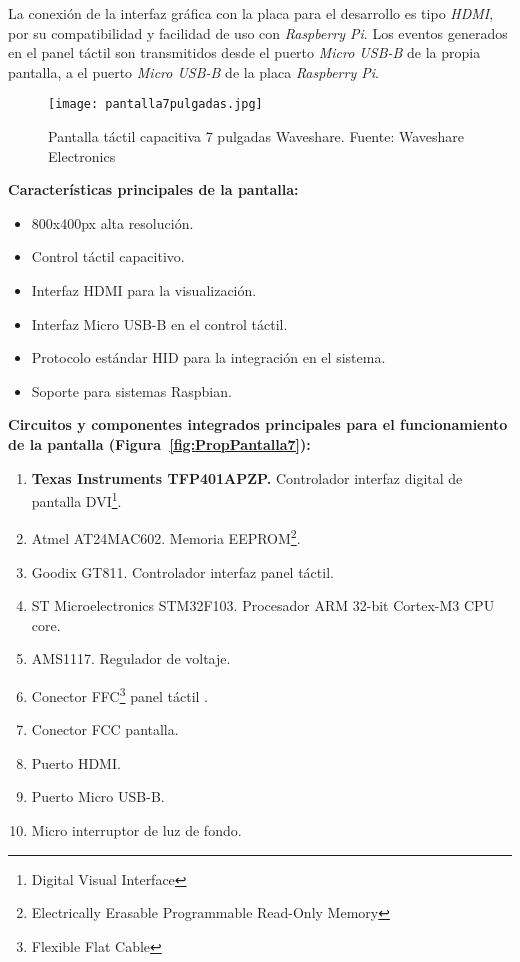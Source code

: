 La conexión de la interfaz gráfica con la placa para el desarrollo es tipo \emph{HDMI}, por su compatibilidad y facilidad de uso con \emph{Raspberry Pi}. Los eventos generados en el panel táctil son transmitidos desde el puerto \emph{Micro USB-B} de la propia pantalla, a el puerto \emph{ Micro USB-B} de la placa \emph{Raspberry Pi}.

\begin{figure}[!h]
\begin{center}
\texttt{[image: pantalla7pulgadas.jpg]}
\caption{Pantalla táctil capacitiva 7 pulgadas Waveshare. Fuente: Waveshare Electronics ~\cite{Waveshare} }
\label{fig:Pantalla7}
\end{center}
\end{figure}

\textbf{Características principales de la pantalla:}
\begin{itemize}
\item 800x400px alta resolución.
\item Control táctil capacitivo.
\item Interfaz HDMI para la visualización.
\item Interfaz Micro USB-B en el control táctil.
\item Protocolo estándar HID para la integración en el sistema.
\item Soporte para sistemas Raspbian.
\end{itemize}


\textbf{Circuitos y componentes integrados principales para el funcionamiento de la pantalla (Figura~\ref{fig:PropPantalla7}):}
\begin{enumerate}
\item \textbf{Texas Instruments TFP401APZP.} Controlador interfaz digital de pantalla DVI\footnote{Digital Visual Interface}.
\item Atmel AT24MAC602. Memoria EEPROM\footnote{Electrically Erasable Programmable Read-Only Memory}.
\item Goodix GT811. Controlador interfaz panel táctil.
\item ST Microelectronics STM32F103. Procesador ARM 32-bit Cortex-M3 CPU core.
\item AMS1117. Regulador de voltaje.
\item Conector FFC\footnote{Flexible Flat Cable} panel táctil .
\item Conector FCC pantalla.
\item Puerto HDMI.
\item Puerto Micro USB-B.
\item Micro interruptor de luz de fondo.
\end{enumerate}

